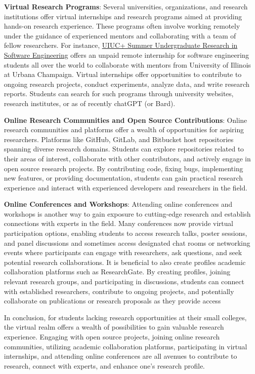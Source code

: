 \documentclass[11pt]{article}
\begin{document}
\textbf{Virtual Research Programs}:
Several universities, organizations, and research institutions offer virtual internships and research programs aimed at providing hands-on research experience. These programs often involve working remotely under the guidance of experienced mentors and collaborating with a team of fellow researchers. For instance, \href{https://docs.google.com/forms/d/1btIwt4HwjyKMOUk-EMy3rbkfWzFxv2lNrMm_zkd0pA4/viewform?edit_requested=true}{UIUC+ Summer Undergraduate Research in Software Engineering}  offers an unpaid remote internship for software engineering students all over the world to collaborate with mentors from University of Illinois at Urbana Champaign. 
Virtual internships offer opportunities to contribute to ongoing research projects, conduct experiments, analyze data, and write research reports. Students can search for such programs through university websites, research institutes, or as of recently chatGPT (or Bard).

\textbf{Online Research Communities and Open Source Contributions}:
Online research communities and platforms offer a wealth of opportunities for aspiring researchers. Platforms like GitHub, GitLab, and Bitbucket host repositories spanning diverse research domains. Students can explore repositories related to their areas of interest, collaborate with other contributors, and actively engage in open source research projects. By contributing code, fixing bugs, implementing new features, or providing documentation, students can gain practical research experience and interact with experienced developers and researchers in the field.

\textbf{Online Conferences and Workshops}:
Attending online conferences and workshops is another way to gain exposure to cutting-edge research and establish connections with experts in the field. Many conferences now provide virtual participation options, enabling students to access research talks, poster sessions, and panel discussions and sometimes access designated chat rooms or networking events where participants can engage with researchers, ask questions, and seek potential research collaborations. It is beneficial to also create profiles academic collaboration platforms such as ResearchGate. By creating profiles, joining relevant research groups, and participating in discussions, students can connect with established researchers, contribute to ongoing projects, and potentially collaborate on publications or research proposals as they provide access 

In conclusion, for students lacking research opportunities at their small colleges, the virtual realm offers a wealth of possibilities to gain valuable research experience. Engaging with open source projects, joining online research communities, utilizing academic collaboration platforms, participating in virtual internships, and attending online conferences are all avenues to contribute to research, connect with experts, and enhance one's research profile.
\end{document}
